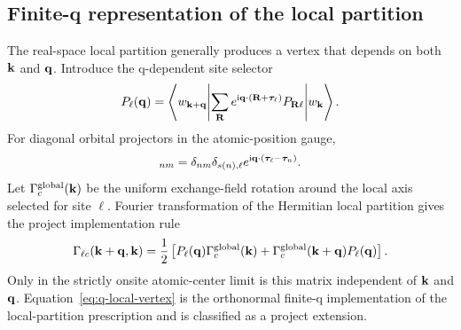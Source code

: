 \subsection{Finite-q representation of the local partition}

The real-space local partition generally produces a vertex that depends on both $\mathbf k$ and $\mathbf q$. Introduce the q-dependent site selector
\begin{equation}
P_\ell(\mathbf q)
=\left\langle w_{\mathbf k+\mathbf q}\middle|
\sum_{\mathbf R}e^{\mathrm{i}\mathbf q\cdot(\mathbf R+\bm\tau_\ell)}P_{\mathbf R\ell}
\middle|w_{\mathbf k}\right\rangle.
\label{eq:q-projector}
\end{equation}
For diagonal orbital projectors in the atomic-position gauge,
\begin{equation}
[P_\ell(\qq)]_{nm}
=\delta_{nm}\delta_{s(n),\ell}
 e^{\ii\qq\cdot(\bm\tau_\ell-\bm\tau_n)}.
\label{eq:q-projector-atomic}
\end{equation}
Let $\Gamma_c^{\rm global}(\mathbf k)$ be the uniform exchange-field rotation around the local axis selected for site $\ell$. Fourier transformation of the Hermitian local partition gives the project implementation rule
\begin{equation}
\Gamma_{\ell c}(\mathbf k+\mathbf q,\mathbf k)
=\frac12\left[
P_\ell(\mathbf q)\Gamma_c^{\rm global}(\mathbf k)
+\Gamma_c^{\rm global}(\mathbf k+\mathbf q)P_\ell(\mathbf q)
\right].
\label{eq:q-local-vertex}
\end{equation}
Only in the strictly onsite atomic-center limit is this matrix independent of $\mathbf k$ and $\mathbf q$. Equation~\eqref{eq:q-local-vertex} is the orthonormal finite-q implementation of the local-partition prescription and is classified as a project extension.
